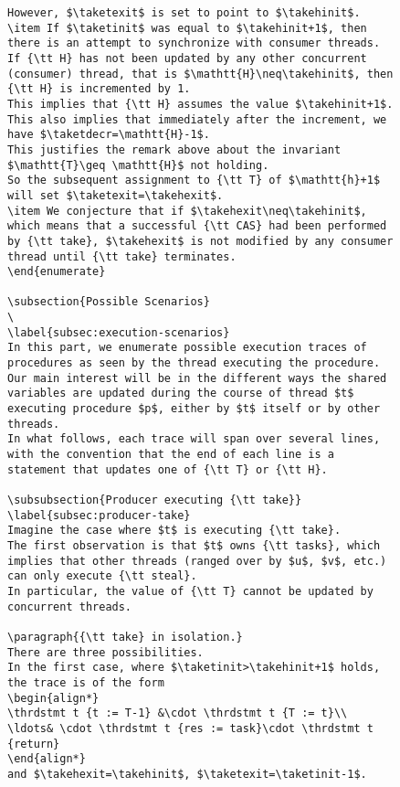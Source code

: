 \documentclass[a4paper]{article}
\begin{document}
{\begin{figure}
\begin{lstlisting}
However, $\taketexit$ is set to point to $\takehinit$.
\item If $\taketinit$ was equal to $\takehinit+1$, then there is an attempt to synchronize with consumer threads.
If {\tt H} has not been updated by any other concurrent (consumer) thread, that is $\mathtt{H}\neq\takehinit$, then {\tt H} is incremented by 1.
This implies that {\tt H} assumes the value $\takehinit+1$.
This also implies that immediately after the increment, we have $\taketdecr=\mathtt{H}-1$. 
This justifies the remark above about the invariant $\mathtt{T}\geq \mathtt{H}$ not holding.
So the subsequent assignment to {\tt T} of $\mathtt{h}+1$ will set $\taketexit=\takehexit$. 
\item We conjecture that if $\takehexit\neq\takehinit$, which means that a successful {\tt CAS} had been performed by {\tt take}, $\takehexit$ is not modified by any consumer thread until {\tt take} terminates.
\end{enumerate}

\subsection{Possible Scenarios}
\
\label{subsec:execution-scenarios}
In this part, we enumerate possible execution traces of procedures as seen by the thread executing the procedure.
Our main interest will be in the different ways the shared variables are updated during the course of thread $t$ executing procedure $p$, either by $t$ itself or by other threads.
In what follows, each trace will span over several lines, with the convention that the end of each line is a statement that updates one of {\tt T} or {\tt H}.

\subsubsection{Producer executing {\tt take}}
\label{subsec:producer-take}
Imagine the case where $t$ is executing {\tt take}. 
The first observation is that $t$ owns {\tt tasks}, which implies that other threads (ranged over by $u$, $v$, etc.) can only execute {\tt steal}.
In particular, the value of {\tt T} cannot be updated by concurrent threads.

\paragraph{{\tt take} in isolation.}
There are three possibilities.
In the first case, where $\taketinit>\takehinit+1$ holds, the trace is of the form 
\begin{align*}
\thrdstmt t {t := T-1} &\cdot \thrdstmt t {T := t}\\
\ldots& \cdot \thrdstmt t {res := task}\cdot \thrdstmt t {return}
\end{align*}
and $\takehexit=\takehinit$, $\taketexit=\taketinit-1$.


\end{lstlisting}
\end{figure}}
\end{document}
